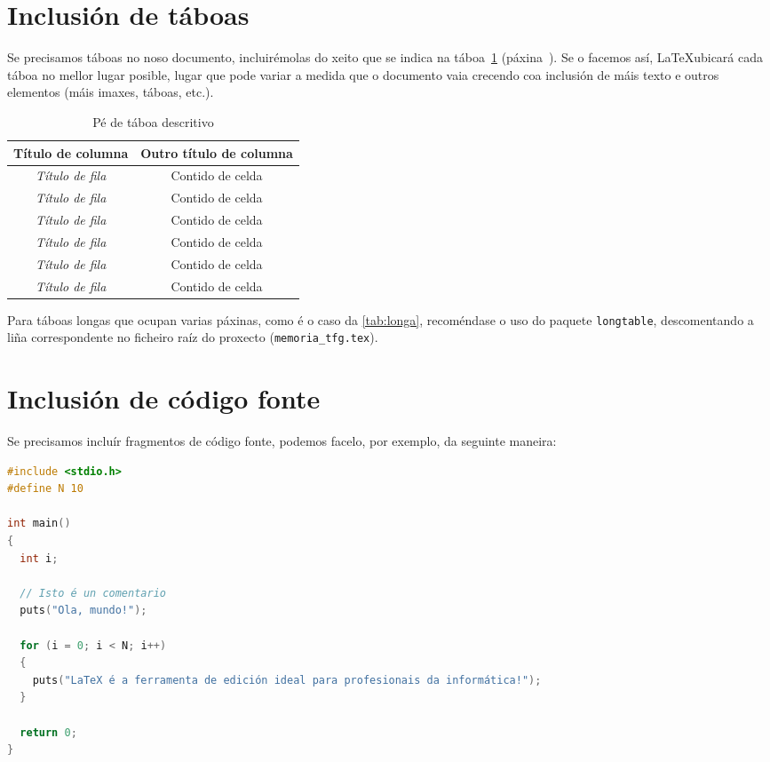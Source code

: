 \section{Inclusión de táboas}

Se precisamos táboas no noso documento, incluirémolas do xeito que se
indica na táboa~\ref{tab:exemplo} (páxina~\pageref{tab:exemplo}). Se
o facemos así, \LaTeX ubicará cada táboa no mellor lugar posible,
lugar que pode variar a medida que o documento vaia crecendo coa
inclusión de máis texto e outros elementos (máis imaxes, táboas,
etc.).

\begin{table}[hp!]
  \centering
  \begin{tabular}{c|c}
  \rowcolor{udcpink!25}
  \textbf{Título de columna} & \textbf{Outro título de columna} \\\hline
  \textit{Título de fila} & Contido de celda \\
  \textit{Título de fila} & Contido de celda \\
  \textit{Título de fila} & Contido de celda \\
  \textit{Título de fila} & Contido de celda \\
  \textit{Título de fila} & Contido de celda \\
  \textit{Título de fila} & Contido de celda \\
  \end{tabular}
  \caption{Pé de táboa descritivo}
  \label{tab:exemplo}
\end{table}

Para táboas longas que ocupan varias páxinas, como é o caso da \ref{tab:longa},
recoméndase o uso do paquete \texttt{longtable}, descomentando a liña
correspondente no ficheiro raíz do proxecto (\verb+memoria_tfg.tex+).



\section{Inclusión de código fonte}

Se precisamos incluír fragmentos de código fonte, podemos facelo, por exemplo, da
seguinte maneira:

\begin{lstlisting}[language=C]
#include <stdio.h>
#define N 10

int main()
{
  int i;

  // Isto é un comentario
  puts("Ola, mundo!");

  for (i = 0; i < N; i++)
  {
    puts("LaTeX é a ferramenta de edición ideal para profesionais da informática!");
  }

  return 0;
}
\end{lstlisting}

